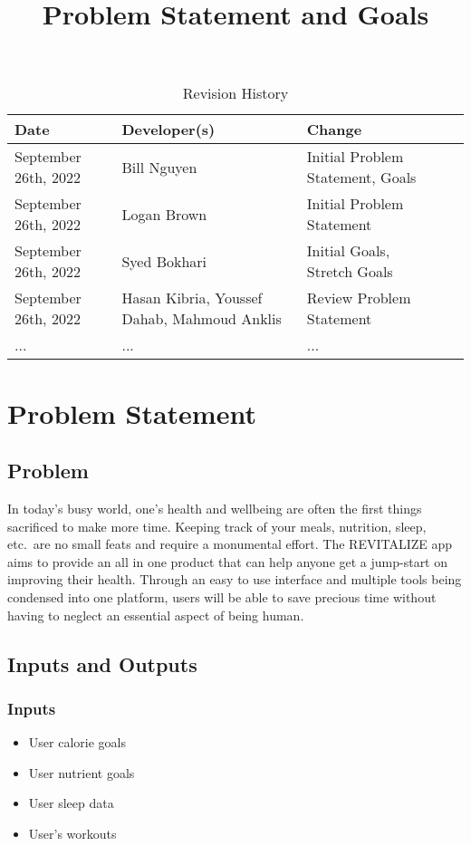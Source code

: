 \documentclass[12pt,letterpaper]{article}
\title{Problem Statement and Goals\\\progname}
\author{\authname}
\date{}
\begin{document}
\maketitle

\begin{table}[hp]
\caption{Revision History} \label{TblRevisionHistory}
\begin{tabularx}{\textwidth}{XlXlX}
\toprule
\textbf{Date} & \textbf{Developer(s)} & \textbf{Change}\\
\midrule
		September 26th, 2022 & Bill Nguyen  & Initial Problem Statement, Goals \\
		September 26th, 2022 & Logan Brown & Initial Problem Statement\\
		September 26th, 2022 & Syed Bokhari & Initial Goals, Stretch Goals\\
		September 26th, 2022 & Hasan Kibria, Youssef Dahab, Mahmoud Anklis  & Review Problem Statement\\
... & ... & ...\\
\bottomrule
\end{tabularx}
\end{table}

\section{Problem Statement}

\subsection{Problem}
\noindent
In today's busy world, one's health and wellbeing are often the first things sacrificed to make more time. Keeping track of your meals, nutrition, sleep, etc.\ are no small feats and require a monumental effort. The REVITALIZE app aims to provide an all in one product that can help anyone get a jump-start on improving their health. Through an easy to use interface and multiple tools being condensed into one platform, users will be able to save precious time without having to neglect an essential aspect of being human.

\subsection{Inputs and Outputs}
\subsubsection{Inputs}
\begin{itemize}
    \item User calorie goals
    \item User nutrient goals
    \item User sleep data
    \item User's workouts 
\end{itemize}
\end{document}
